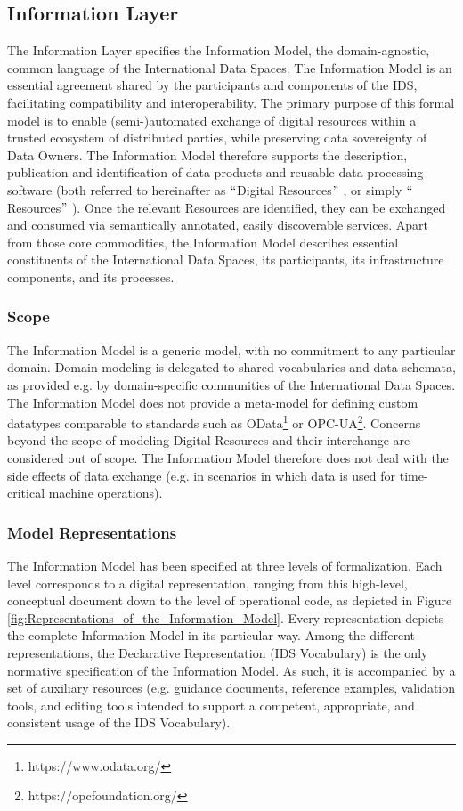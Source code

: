 
\subsection{Information Layer}
The Information Layer specifies the Information Model, the domain-agnostic, common language of the International Data Spaces. The Information Model is an essential agreement shared by the participants and components of the IDS, facilitating compatibility and interoperability. The primary purpose of this formal model is to enable (semi-)automated exchange of digital resources within a trusted ecosystem of distributed parties, while preserving data sovereignty of Data Owners. The Information Model therefore supports the description, publication and identification of data products and reusable data processing software (both referred to hereinafter as $``$Digital Resources$"$ , or simply $``$Resources$"$ ). Once the relevant Resources are identified, they can be exchanged and consumed via semantically annotated, easily discoverable services. Apart from those core commodities, the Information Model describes essential constituents of the International Data Spaces, its participants, its infrastructure components, and its processes.

\subsubsection{Scope}
The Information Model is a generic model, with no commitment to any particular domain. Domain modeling is delegated to shared vocabularies and data schemata, as provided e.g. by domain-specific communities of the International Data Spaces. The Information Model does not provide a meta-model for defining custom datatypes comparable to standards such as OData\footnote{https://www.odata.org/ } or OPC-UA\footnote{https://opcfoundation.org/ }. Concerns beyond the scope of modeling Digital Resources and their interchange are considered out of scope. The Information Model therefore does not deal with the side effects of data exchange (e.g. in scenarios in which data is used for time-critical machine operations).

\subsubsection{Model Representations}
The Information Model has been specified at three levels of formalization. Each level corresponds to a digital representation, ranging from this high-level, conceptual document down to the level of operational code, as depicted in Figure \ref{fig:Representations_of_the_Information_Model}. Every representation depicts the complete Information Model in its particular way. Among the different representations, the Declarative Representation (IDS Vocabulary) is the only normative specification of the Information Model. As such, it is accompanied by a set of auxiliary resources (e.g. guidance documents, reference examples, validation tools, and editing tools intended to support a competent, appropriate, and consistent usage of the IDS Vocabulary).


